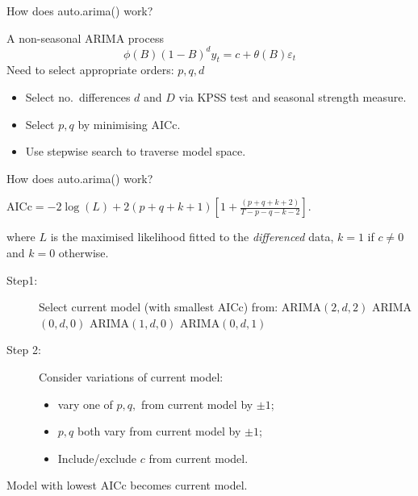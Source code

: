 \documentclass[14pt,ignorenonframetext,]{beamer}
\providecommand{\tightlist}{%
  \setlength{\itemsep}{0pt}\setlength{\parskip}{0pt}}
\begin{document}
\begin{frame}{How does auto.arima() work?}

\begin{block}{A non-seasonal ARIMA process}
\[
\phi(B)(1-B)^dy_{t} = c + \theta(B)\varepsilon_t
\]
Need to select appropriate orders: \alert{$p,q, d$}
\end{block}


\begin{itemize}
\tightlist
\item
  Select no.~differences \alert{$d$} and \alert{$D$} via KPSS test and
  seasonal strength measure.
\item
  Select \alert{$p,q$} by minimising AICc.
\item
  Use stepwise search to traverse model space.
\end{itemize}

\end{frame}

\begin{frame}{How does auto.arima() work?}

\fontsize{12}{13}\sf

\begin{block}{}
\centerline{$\text{AICc} = -2 \log(L) + 2(p+q+k+1)\left[1 +
\frac{(p+q+k+2)}{T-p-q-k-2}\right].$}
where $L$ is the maximised likelihood fitted to the \textit{differenced} data,
$k=1$ if $c\neq 0$ and $k=0$ otherwise.
\end{block}

\pause

\begin{description}
\item[Step1:]
Select current model (with smallest AICc) from:\newline
ARIMA\((2,d,2)\)\newline
ARIMA\((0,d,0)\)\newline
ARIMA\((1,d,0)\)\newline
ARIMA\((0,d,1)\) \pause\vspace*{-0.1cm}
\item[Step 2:]
Consider variations of current model:

\begin{itemize}
\tightlist
\item
  vary one of \(p,q,\) from current model by \(\pm1\);
\item
  \(p,q\) both vary from current model by \(\pm1\);
\item
  Include/exclude \(c\) from current model.
\end{itemize}
\end{description}

Model with lowest AICc becomes current model.


\end{frame}
\end{document}
